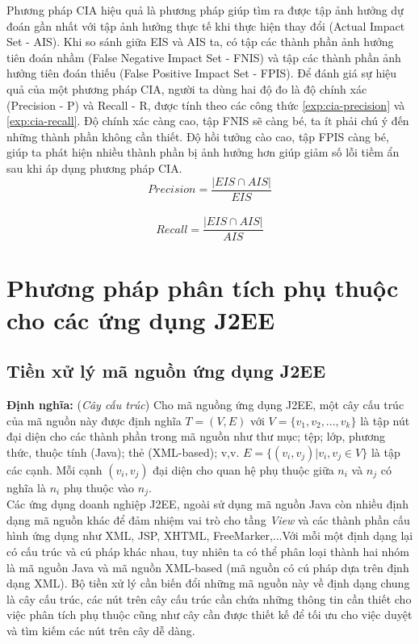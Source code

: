 \documentclass[12pt]{report}
\begin{document}
Phương pháp CIA hiệu quả là phương pháp giúp tìm ra được tập ảnh hưởng dự đoán gần nhất với tập ảnh hưởng thực tế khi thực hiện thay đổi (Actual Impact Set - AIS). Khi so sánh giữa EIS và AIS ta, có tập các thành phần ảnh hưởng tiên đoán nhầm (False Negative Impact Set - FNIS) và tập các thành phần ảnh hưởng tiên đoán thiếu (False Positive Impact Set - FPIS). Để đánh giá sự hiệu quả của một phương pháp CIA, người ta dùng hai độ đo là độ chính xác (Precision - P) và Recall - R, được tính theo các công thức \ref{exp:cia-precision} và \ref{exp:cia-recall}. Độ chính xác càng cao, tập FNIS sẽ càng bé, ta ít phải chú ý đến những thành phần không cần thiết. Độ hồi tưởng cào cao, tập FPIS càng bé, giúp ta phát hiện nhiều thành phần bị ảnh hưởng hơn giúp giảm số lỗi tiềm ẩn sau khi áp dụng phương pháp CIA.\\

\begin{equation}
	Precision = \frac{|EIS \cap AIS|}{EIS}
	\label{exp:cia-precision}
\end{equation}
\\
\begin{equation}
	Recall = \frac{|EIS \cap AIS|}{AIS}
	\label{exp:cia-recall}
\end{equation}


\newpage
\chapter{Phương pháp phân tích phụ thuộc cho các ứng dụng J2EE}
\section{Tiền xử lý mã nguồn ứng dụng J2EE}
\textbf{Định nghĩa:} (\textit{Cây cấu trúc}) Cho mã nguồng ứng dụng J2EE, một cây cấu trúc của mã nguồn này được định nghĩa $T = (V, E)$ với $V = \{v_1, v_2,..., v_k\}$ là tập nút đại diện cho các thành phần trong mã nguồn như thư mục; tệp; lớp, phương thức, thuộc tính (Java); thẻ (XML-based); v,v. $E = \{(v_i, v_j) | v_i,v_j \in V\}$ là tập các cạnh. Mỗi cạnh $(v_i,v_j)$ đại diện cho quan hệ phụ thuộc giữa $n_i$ và $n_j$ có nghĩa là $n_i$ phụ thuộc vào $n_j$.\\

Các ứng dụng doanh nghiệp J2EE, ngoài sử dụng mã nguồn Java còn nhiều định dạng mã nguồn khác để đảm nhiệm vai trò cho tầng \textit{View} và các thành phần cấu hình ứng dụng như XML, JSP, XHTML, FreeMarker,...Với mỗi một định dạng lại có cấu trúc và cú pháp khác nhau, tuy nhiên ta có thể phân loại thành hai nhóm là mã nguồn Java và mã nguồn XML-based (mã nguồn có cú pháp dựa trên định dạng XML). Bộ tiền xử lý cần biến đổi những mã nguồn này về định dạng chung là cây cấu trúc, các nút trên cây cấu trúc cần chứa những thông tin cần thiết cho việc phân tích phụ thuộc cũng như cây cần được thiết kế để tối ưu cho việc duyệt và tìm kiếm các nút trên cây dễ dàng.\\
\end{document}
